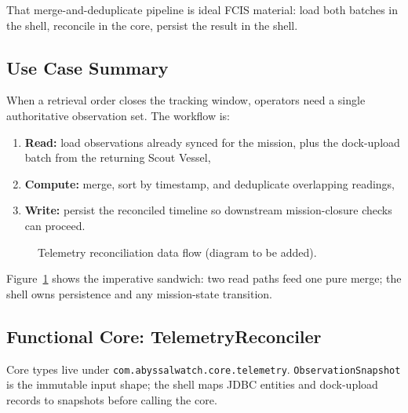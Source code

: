 That merge-and-deduplicate pipeline is ideal FCIS material: load both batches in the shell, reconcile in the core, persist the result in the shell.

\subsection{Use Case Summary}
\label{sec:fcis_reconciliation_use_case}

When a retrieval order closes the tracking window, operators need a single authoritative observation set. The workflow is:
\begin{enumerate}
    \item \textbf{Read:} load observations already synced for the mission, plus the dock-upload batch from the returning Scout Vessel,
    \item \textbf{Compute:} merge, sort by timestamp, and deduplicate overlapping readings,
    \item \textbf{Write:} persist the reconciled timeline so downstream mission-closure checks can proceed.
\end{enumerate}

\begin{figure}[htbp]
\centering
{}
\caption{Telemetry reconciliation data flow (diagram to be added).}
\label{fig:fcis_reconciliation_flow}
\end{figure}

Figure~\ref{fig:fcis_reconciliation_flow} shows the imperative sandwich: two read paths feed one pure merge; the shell owns persistence and any mission-state transition.

\subsection{Functional Core: TelemetryReconciler}
\label{sec:fcis_reconciliation_core}

Core types live under \texttt{com.abyssalwatch.core.telemetry}. \texttt{ObservationSnapshot} is the immutable input shape; the shell maps JDBC entities and dock-upload records to snapshots before calling the core.

